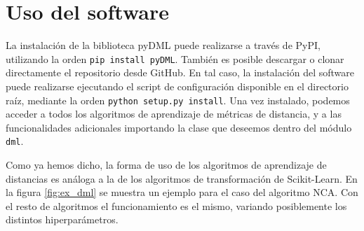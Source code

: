 \section{Uso del software}

La instalación de la biblioteca pyDML puede realizarse a través de PyPI, utilizando la orden \texttt{pip install pyDML}. También es posible descargar o clonar directamente el repositorio desde GitHub. En tal caso, la instalación del software puede realizarse ejecutando el script de configuración disponible en el directorio raíz, mediante la orden \texttt{python setup.py install}. Una vez instalado, podemos acceder a todos los algoritmos de aprendizaje de métricas de distancia, y a las funcionalidades adicionales importando la clase que deseemos dentro del módulo \texttt{dml}.

Como ya hemos dicho, la forma de uso de los algoritmos de aprendizaje de distancias es análoga a la de los algoritmos de transformación de Scikit-Learn. En la figura \ref{fig:ex_dml} se muestra un ejemplo para el caso del algoritmo NCA. Con el resto de algoritmos el funcionamiento es el mismo, variando posiblemente los distintos hiperparámetros.

